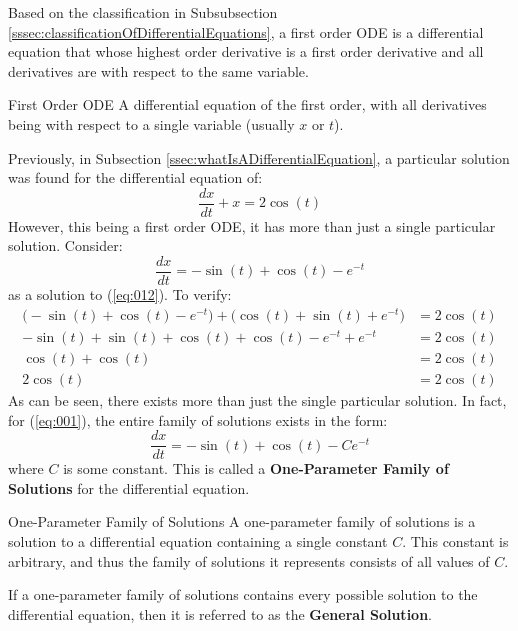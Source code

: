 \documentclass[12pt]{article}
\begin{document}
Based on the classification in Subsubsection \ref{sssec:classificationOfDifferentialEquations}, a first order ODE is a differential equation that whose highest order derivative is a first order derivative and all derivatives are with respect to the same variable.

\begin{definition}{First Order ODE}
  A differential equation of the first order, with all derivatives being with respect to a single variable (usually $x$ or $t$).
\end{definition}

Previously, in Subsection \ref{ssec:whatIsADifferentialEquation}, a particular solution was found for the differential equation of:
\begin{equation*}
  \frac{dx}{dt} + x = 2 \cos(t)
  \label{eq:012}
\end{equation*}
However, this being a first order ODE, it has more than just a single particular solution. Consider:
\begin{equation*}
  \frac{dx}{dt} = -\sin(t) + \cos(t) - e^{-t}
\end{equation*}
as a solution to (\ref{eq:012}). To verify:
\begin{align*}
  \big(-\sin(t) + \cos(t) - e^{-t}\big) + \big(\cos(t) + \sin(t) + e^{-t}\big) &= 2\cos(t) \\
  -\sin(t) + \sin(t) + \cos(t) + \cos(t) - e^{-t} + e^{-t} &= 2\cos(t) \\
  \cos(t) + \cos(t) &= 2\cos(t) \\
  2\cos(t) &= 2\cos(t)
\end{align*}
As can be seen, there exists more than just the single particular solution. In fact, for (\ref{eq:001}), the entire family of solutions exists in the form:
\begin{equation*}
  \frac{dx}{dt} = -\sin(t) + \cos(t) - Ce^{-t}
\end{equation*}
where $C$ is some constant. This is called a \textbf{One-Parameter Family of Solutions} for the differential equation.

\begin{definition}{One-Parameter Family of Solutions}
  A one-parameter family of solutions is a solution to a differential equation containing a single constant $C$. This constant is arbitrary, and thus the family of solutions it represents consists of all values of $C$.
\end{definition}

If a one-parameter family of solutions contains every possible solution to the differential equation, then it is referred to as the \textbf{General Solution}.
\end{document}
